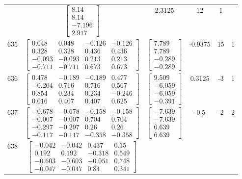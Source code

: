 \documentclass[a4paper,12pt]{article}
\begin{document}
\begin{tabular}{c c c c c c}
&
$\begin{bmatrix} 8.14 \\ 8.14 \\ -7.196 \\ 2.917 \end{bmatrix}$
&
2.3125
&
12
&
1
\\
635
&
$\begin{bmatrix} 0.048 & 0.048 & -0.126 & -0.126 \\ 0.328 & 0.328 & 0.436 & 0.436 \\ -0.093 & -0.093 & 0.213 & 0.213 \\ -0.711 & -0.711 & 0.673 & 0.673 \end{bmatrix}$
&
$\begin{bmatrix} 7.789 \\ 7.789 \\ -0.289 \\ -0.289 \end{bmatrix}$
&
-0.9375
&
15
&
1
\\
636
&
$\begin{bmatrix} 0.478 & -0.189 & -0.189 & 0.477 \\ -0.204 & 0.716 & 0.716 & 0.567 \\ 0.854 & 0.234 & 0.234 & -0.246 \\ 0.016 & 0.407 & 0.407 & 0.625 \end{bmatrix}$
&
$\begin{bmatrix} 9.509 \\ -6.059 \\ -6.059 \\ -0.391 \end{bmatrix}$
&
0.3125
&
-3
&
1
\\
637
&
$\begin{bmatrix} -0.678 & -0.678 & -0.158 & -0.158 \\ -0.007 & -0.007 & 0.704 & 0.704 \\ -0.297 & -0.297 & 0.26 & 0.26 \\ -0.117 & -0.117 & -0.358 & -0.358 \end{bmatrix}$
&
$\begin{bmatrix} -7.639 \\ -7.639 \\ 6.639 \\ 6.639 \end{bmatrix}$
&
-0.5
&
-2
&
2
\\
638
&
$\begin{bmatrix} -0.042 & -0.042 & 0.437 & 0.15 \\ 0.192 & 0.192 & -0.318 & 0.549 \\ -0.603 & -0.603 & -0.051 & 0.748 \\ -0.047 & -0.047 & 0.84 & 0.341 \end{bmatrix}$

\end{tabular}
\end{document}

